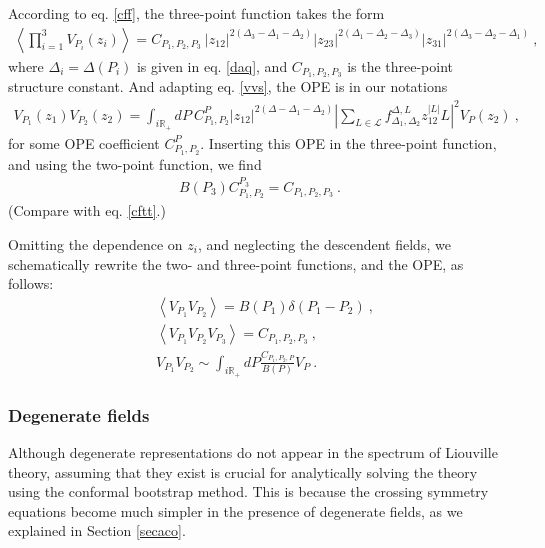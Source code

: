 \documentclass[12pt, a4paper, notitlepage, twoside]{report}
\numberwithin{equation}{section}
\theoremstyle{break}
\begin{document}
According to eq. \eqref{cff}, the three-point function takes the form
\begin{align}
\left\langle \prod_{i=1}^3 V_{P_i}(z_i)\right\rangle = C_{P_1,P_2,P_3}\ |z_{12}|^{2(\Delta_3-\Delta_1-\Delta_2)} |z_{23}|^{2(\Delta_1-\Delta_2-\Delta_3)} |z_{31}|^{2(\Delta_3-\Delta_2-\Delta_1)}\ ,
\label{vvv}
\end{align}
where $\Delta_i = \Delta(P_i)$ is given in eq. \eqref{daq}, and $C_{P_1,P_2,P_3}$ is the three-point structure constant. And adapting eq. \eqref{vvs}, the OPE is in our notations
\begin{align}
 V_{P_1}(z_1) V_{P_2}(z_2) = \int_{i{\mathbb{R}_+}} dP\ C_{P_1,P_2}^P |z_{12}|^{2(\Delta-\Delta_1-\Delta_2)} 
\left|
\sum_{L\in \mathcal{L}} f_{\Delta_1,\Delta_2}^{\Delta,L} z_{12}^{|L|}  L\right|^2 V_{P}(z_2) \ , 
\end{align}
for some OPE coefficient $C_{P_1,P_2}^P$. Inserting this OPE in the three-point function, and using the two-point function, we find
\begin{align}
 B(P_3)C_{P_1,P_2}^{P_3} = C_{P_1,P_2,P_3}
\ . 
\label{hcc}
\end{align}
(Compare with eq. \eqref{cftt}.) 

Omitting the dependence on $z_i$, and neglecting the descendent fields, we schematically rewrite the two- and three-point functions, and the OPE, as follows: 
\begin{align}
 &\boxed{\left\langle V_{P_1}V_{P_2} \right\rangle = B(P_1)\delta(P_1-P_2) }\ ,
\label{vvss}
\\
 &\boxed{ \left\langle V_{P_1}V_{P_2}V_{P_3} \right\rangle = C_{P_1,P_2,P_3} }\ ,
\label{vvvs}
\\
 &\boxed{V_{P_1}V_{P_2} \sim \int_{i{\mathbb{R}_+}} dP \frac{C_{P_1,P_2,P}}{B(P)} V_P}\ .
\label{vvi}
\end{align}



\subsubsection{Degenerate fields}

Although degenerate representations do not appear in the spectrum of Liouville theory, assuming  that they exist is crucial for analytically solving the theory using the conformal bootstrap method. This is because the crossing symmetry equations become much simpler in the presence of degenerate fields, as we explained in Section \ref{secaco}.
\end{document}
